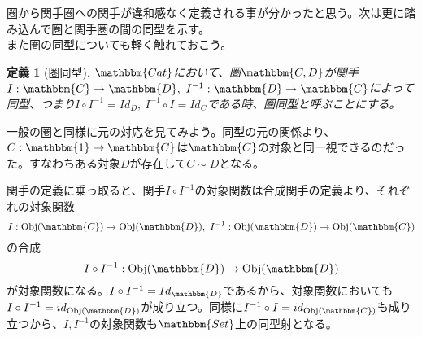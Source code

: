 \documentclass[uplatex,dvipdfmx]{jsarticle}
\newcommand{\cat}[1]{\mathbbm{#1}}
\newcommand{\arrow}{\rightarrow}
\newcommand{\functor}[3]{#1:\cat{#2}\arrow \cat{#3}}
\newcommand{\obj}[1]{\mathrm{Obj}(\cat{#1})}
\newcommand{\mor}[3]{#1:#2\arrow #3}
\newtheorem{define}[proof]{定義}
\numberwithin{proof}{subsection}
\begin{document}
  圏から関手圏への関手が違和感なく定義される事が分かったと思う。次は更に踏み込んで圏と関手圏の間の同型を示す。\\
  また圏の同型についても軽く触れておこう。
  \begin{define}[圏同型]
    $\cat{Cat}$において、圏$\cat{C,D}$が関手$\functor{I}{C}{D},\ \functor{I^{-1}}{D}{C}$によって同型、つまり$I\circ I^{-1}=Id_D,\ I^{-1}\circ I=Id_C$である時、圏同型と呼ぶことにする。
  \end{define}
  一般の圏と同様に元の対応を見てみよう。同型の元の関係より、$\functor{C}{1}{C}$は$\cat{C}$の対象と同一視できるのだった。すなわちある対象$D$が存在して$C\sim D$となる。\\

  \begin{center}
  \end{center}
  関手の定義に乗っ取ると、関手$I\circ I^{-1}$の対象関数は合成関手の定義より、それぞれの対象関数\[\mor{I}{\obj{C}}{\obj{D}},\ \mor{I^{-1}}{\obj{D}}{\obj{C}}\]の合成\[\mor{I\circ I^{-1}}{\obj{D}}{\obj{D}}\]が対象関数になる。$I\circ I^{-1}=Id_\cat{D}$であるから、対象関数においても$I\circ I^{-1}=id_{\obj{D}}$が成り立つ。同様に$I^{-1}\circ I=id_{\obj{C}}$も成り立つから、$I,I^{-1}$の対象関数も$\cat{Set}$上の同型射となる。
\end{document}
